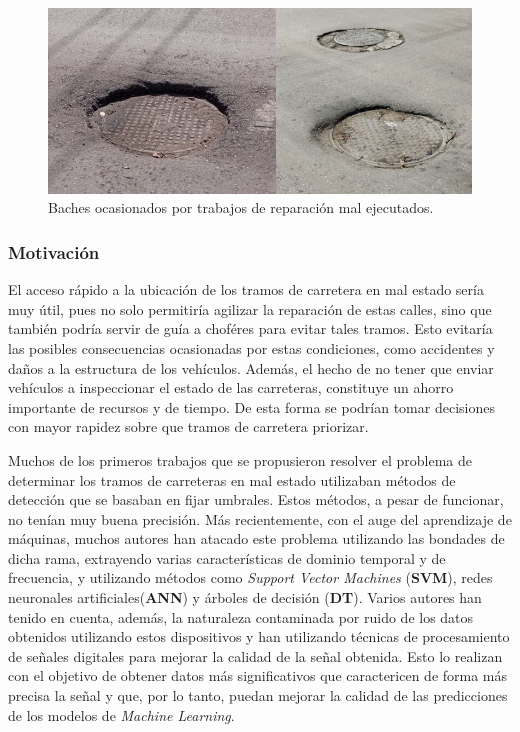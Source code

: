 \begin{figure}[htb]
	\centering
	\includegraphics[scale=0.45]{Graphics/pothole_due_to_bad_job_1}
	\caption{Baches ocasionados por trabajos de reparación mal ejecutados.}
	\label{fig:1}
\end{figure}
	
	\subsubsection*{Motivación}
		El acceso rápido a la ubicación de los tramos de carretera en mal estado sería muy útil, pues no solo permitiría agilizar la
		reparación de estas calles, sino que también podría servir de guía a choféres para evitar tales tramos. Esto evitaría las posibles
		consecuencias ocasionadas por estas condiciones, como accidentes y daños a la estructura de los vehículos. Además, el hecho de no tener que
		enviar vehículos a inspeccionar el estado de las carreteras, constituye un ahorro importante de recursos y de tiempo. De esta forma se podrían
		tomar decisiones con mayor rapidez sobre que tramos de carretera priorizar.
		
		Muchos de los primeros trabajos que se propusieron resolver el problema de determinar los tramos de carreteras en mal estado utilizaban
		métodos de detección que se basaban en fijar umbrales. Estos métodos, a pesar de funcionar, no tenían muy buena precisión. Más recientemente, con el auge del aprendizaje de máquinas, muchos autores han atacado este problema utilizando
		las bondades de dicha rama, extrayendo varias características de dominio temporal y de frecuencia, y utilizando métodos como \emph{Support Vector
		Machines} (\textbf{SVM}), redes neuronales artificiales(\textbf{ANN}) y árboles de decisión (\textbf{DT}). Varios autores han tenido en cuenta, además, la naturaleza contaminada por ruido de
		los datos obtenidos utilizando estos dispositivos y han utilizando técnicas de procesamiento de señales digitales para mejorar la calidad de la señal
		obtenida.  Esto lo realizan con el objetivo de obtener datos más significativos que caractericen de forma más precisa la señal y que, por lo tanto, puedan mejorar
		la calidad de las predicciones de los modelos de \emph{Machine Learning}.\\
		

